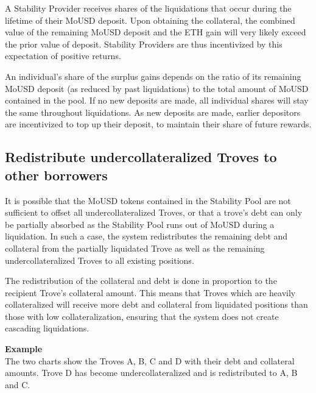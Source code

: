 \documentclass{article}
\begin{document}
A Stability Provider receives shares of the liquidations that occur during the lifetime of their MoUSD deposit. Upon obtaining the collateral, the combined value of the remaining MoUSD deposit and the ETH gain will very likely exceed the prior value of deposit. Stability Providers are thus incentivized by this expectation of positive returns.

An individual’s share of the surplus gains depends on the ratio of its remaining MoUSD deposit (as reduced by past liquidations) to the total amount of MoUSD contained in the pool. If no new deposits are made, all individual shares will stay the same throughout liquidations. As new deposits are made, earlier depositors are incentivized to top up their deposit, to maintain their share of future rewards.

\subsection{Redistribute undercollateralized Troves to other borrowers}
It is possible that the MoUSD tokens contained in the Stability Pool are not sufficient to offset all undercollateralized Troves, or that a trove’s debt can only be partially absorbed as the Stability Pool runs out of MoUSD during a liquidation. In such a case, the system redistributes the remaining debt and collateral from the partially liquidated Trove as well as the remaining undercollateralized Troves to all existing positions.

The redistribution of the collateral and debt is done in proportion to the recipient Trove’s collateral amount. This means that Troves which are heavily collateralized will receive more debt and collateral from liquidated positions than those with low collateralization, ensuring that the system does not create cascading liquidations.\\

\begin{tcolorbox}
\textbf{Example}\\
The two charts show the Troves A, B, C and D with their debt and collateral amounts. Trove D has become undercollateralized and is redistributed to A, B and C.
\end{tcolorbox}
\end{document}
